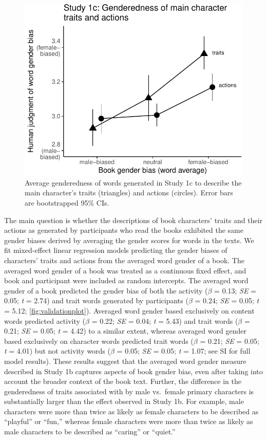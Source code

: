 \documentclass[
  english,
  ,man,floatsintext]{apa6}
\begin{document}
\begin{figure}[t]
\includegraphics{figs/fig4.pdf} \caption{Average genderedness of words generated in Study 1c to describe the main character's traits (triangles) and actions (circles). Error bars are bootstrapped 95\% CIs.}\label{fig:validationplot}
\end{figure}

The main question is whether the descriptions of book characters' traits and their actions as generated by participants who read the books exhibited the same gender biases derived by averaging the gender scores for words in the texts. We fit mixed-effect linear regression models predicting the gender biases of characters' traits and actions from the averaged word gender of a book. The averaged word gender of a book was treated as a continuous fixed effect, and book and participant were included as random intercepts. The averaged word gender of a book predicted the gender bias of both the activity (\(\beta\) = 0.13; \emph{SE} = 0.05; \emph{t} = 2.74) and trait words generated by participants (\(\beta\) = 0.24; \emph{SE} = 0.05; \emph{t} = 5.12; \autoref{fig:validationplot}). Averaged word gender based exclusively on content words predicted activity (\(\beta\) = 0.22; \emph{SE} = 0.04; \emph{t} = 5.43) and trait words (\(\beta\) = 0.21; \emph{SE} = 0.05; \emph{t} = 4.42) to a similar extent, whereas averaged word gender based exclusively on character words predicted trait words (\(\beta\) = 0.21; \emph{SE} = 0.05; \emph{t} = 4.01) but not activity words (\(\beta\) = 0.05; \emph{SE} = 0.05; \emph{t} = 1.07; see SI for full model results). These results suggest that the averaged word gender measure described in Study 1b captures aspects of book gender bias, even after taking into account the broader context of the book text. Further, the difference in the genderedness of traits associated with by male vs.~female primary characters is substantially larger than the effect observed in Study 1b. For example, male characters were more than twice as likely as female characters to be described as ``playful'' or ``fun,'' whereas female characters were more than twice as likely as male characters to be described as ``caring'' or ``quiet.''
\end{document}
